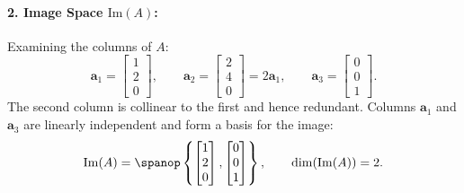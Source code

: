 \begin{example}
\paragraph{2. Image Space $\mathrm{Im}(A)$:}
Examining the columns of $A$:
\begin{equation}
    \mathbf{a}_1 = \begin{bmatrix} 1 \\ 2 \\ 0 \end{bmatrix}, \qquad \mathbf{a}_2 = \begin{bmatrix} 2 \\ 4 \\ 0 \end{bmatrix} = 2\mathbf{a}_1, \qquad \mathbf{a}_3 = \begin{bmatrix} 0 \\ 0 \\ 1 \end{bmatrix}.
\end{equation}
The second column is collinear to the first and hence redundant. Columns $\mathbf{a}_1$ and $\mathbf{a}_3$ are linearly independent and form a basis for the image:
\begin{equation}
    \mathrm{Im}(A) = \spanop\left\{ \begin{bmatrix} 1 \\ 2 \\ 0 \end{bmatrix}, \begin{bmatrix} 0 \\ 0 \\ 1 \end{bmatrix} \right\}, \qquad \dim(\mathrm{Im}(A)) = 2.
\end{equation}


\end{example}
